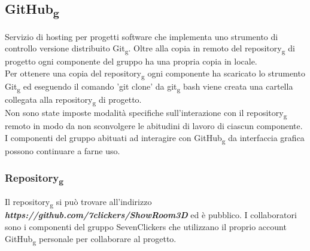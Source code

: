 \subsection{GitHub\textsubscript{g}}
Servizio di hosting per progetti software che implementa uno strumento di controllo versione distribuito Git\textsubscript{g}.
Oltre alla copia in remoto del repository\textsubscript{g} di progetto ogni componente del gruppo ha una propria copia in locale.\\
Per ottenere una copia del repository\textsubscript{g} ogni componente ha scaricato lo strumento Git\textsubscript{g} ed eseguendo il 
comando 'git clone' da git\textsubscript{g} bash viene creata una cartella collegata alla repository\textsubscript{g} di progetto.\\
Non sono state imposte modalità specifiche sull'interazione con il repository\textsubscript{g} remoto in modo da non sconvolgere le abitudini di lavoro di 
ciascun componente.\\
I componenti del gruppo abituati ad interagire con GitHub\textsubscript{g} da interfaccia grafica possono continuare a farne uso.
\subsubsection{Repository\textsubscript{g}}
Il repository\textsubscript{g} si può trovare all'indirizzo \textbf{\textit{https://github.com/7clickers/ShowRoom3D}} ed è pubblico. 
I collaboratori sono i componenti del gruppo SevenClickers che utilizzano il proprio account GitHub\textsubscript{g} personale per collaborare al progetto.
